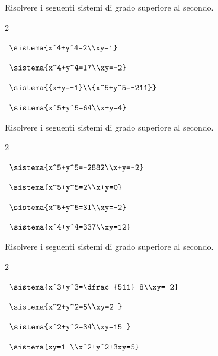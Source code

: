 \begin{esercizio}[*]
\label{ese:6.30}
Risolvere i seguenti sistemi di grado superiore al secondo.
\begin{htmulticols}{2}
\begin{enumeratea}
\item~\(\sistema{x^4+y^4=2\\xy=1}\)
\item~\(\sistema{x^4+y^4=17\\xy=-2}\)

\item~\(\sistema{{x+y=-1}\\{x^5+y^5=-211}}\)
\item~\(\sistema{x^5+y^5=64\\x+y=4}\)
\end{enumeratea}
\end{htmulticols}
\end{esercizio}

\begin{esercizio}[*]
\label{ese:6.31}
Risolvere i seguenti sistemi di grado superiore al secondo.
\begin{htmulticols}{2}
\begin{enumeratea}
\item~\(\sistema{x^5+y^5=-2882\\x+y=-2}\)
\item~\(\sistema{x^5+y^5=2\\x+y=0}\)
\item~\(\sistema{x^5+y^5=31\\xy=-2}\)
\item~\(\sistema{x^4+y^4=337\\xy=12}\)
\end{enumeratea}
\end{htmulticols}
\end{esercizio}

\begin{esercizio}[*]
\label{ese:6.32}
Risolvere i seguenti sistemi di grado superiore al secondo.
\begin{htmulticols}{2}
\begin{enumeratea}
\item~\(\sistema{x^3+y^3=\dfrac{511} 
8\\xy=-2}\)
\item~\(\sistema{x^2+y^2=5\\xy=2 }\)
\item~\(\sistema{x^2+y^2=34\\xy=15 }\)
\item~\(\sistema{xy=1 \\x^2+y^2+3xy=5}\)
\end{enumeratea}
\end{htmulticols}
\end{esercizio}

